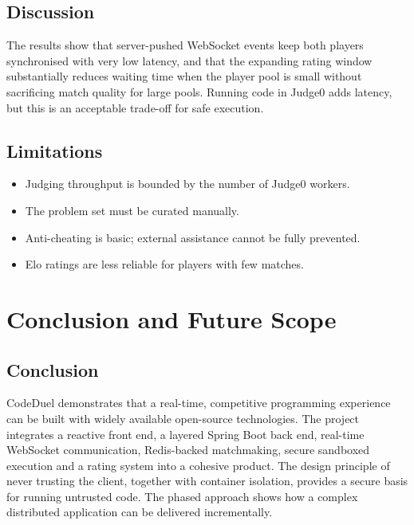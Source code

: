 \documentclass[12pt,a4paper,oneside]{report}
\begin{document}
\section{Discussion}
The results show that server-pushed WebSocket events keep both players synchronised with very low latency,
and that the expanding rating window substantially reduces waiting time when the player pool is small
without sacrificing match quality for large pools. Running code in Judge0 adds latency, but this is an
acceptable trade-off for safe execution.

\section{Limitations}
\begin{itemize}[leftmargin=*]
  \item Judging throughput is bounded by the number of Judge0 workers.
  \item The problem set must be curated manually.
  \item Anti-cheating is basic; external assistance cannot be fully prevented.
  \item Elo ratings are less reliable for players with few matches.
\end{itemize}

\chapter{Conclusion and Future Scope}
\section{Conclusion}
CodeDuel demonstrates that a real-time, competitive programming experience can be built with widely
available open-source technologies. The project integrates a reactive front end, a layered Spring Boot
back end, real-time WebSocket communication, Redis-backed matchmaking, secure sandboxed execution and a
rating system into a cohesive product. The design principle of never trusting the client, together with
container isolation, provides a secure basis for running untrusted code. The phased approach shows how a
complex distributed application can be delivered incrementally.
\end{document}
